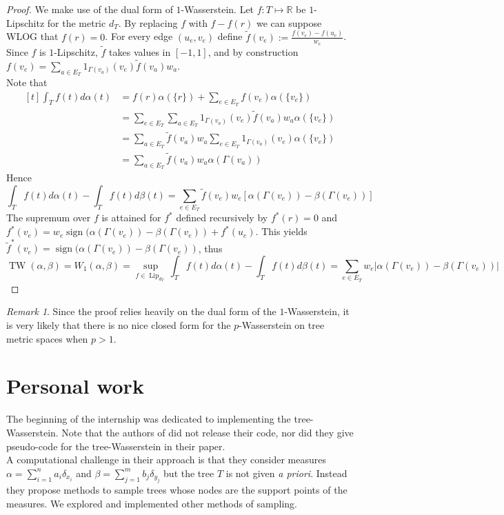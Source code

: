 \documentclass[12pt]{report}
\theoremstyle{definition}
\theoremstyle{remark}
\newtheorem{rem}[defi]{Remark}
\DeclareMathOperator{\lip}{Lip}
\DeclareMathOperator{\tw}{TW}
\DeclareMathOperator{\sgn}{sign}
\begin{document}
\begin{proof}
	We make use of the dual form of $1$-Wasserstein. Let $f:T\mapsto \mathbb R$ be $1$-Lipschitz for the metric $d_T$. By replacing $f$ with $f-f(r)$ we can suppose WLOG that $f(r)=0$. For every edge $(u_e,v_e)$ define $\tilde f(v_e):=\frac{f(v_e)-f(u_e)}{w_e}$. Since $f$ is $1$-Lipschitz, $\tilde f$ takes values in $[-1,1]$, and by construction $\displaystyle f(v_e)=\sum_{a\in E_T} 1_{\Gamma(v_a)}(v_e)\tilde f(v_a)w_a$.\\
	Note that $$\begin{aligned}[t]
		\int_T f(t) d\alpha(t) &= f(r)\alpha(\{r\}) + \sum_{e\in E_T} f(v_e)\alpha(\{v_e\}) \\
		&= \sum_{e\in E_T} \sum_{a\in E_T} 1_{\Gamma(v_a)}(v_e)\tilde f(v_a)w_a\alpha(\{v_e\})\\
		&= \sum_{a\in E_T} \tilde f(v_a)w_a \sum_{e\in E_T}  1_{\Gamma(v_a)}(v_e)\alpha(\{v_e\}) \\
		&= \sum_{a\in E_T} \tilde f(v_a)w_a \alpha(\Gamma(v_a))
	\end{aligned}$$
	Hence $$\int_T f(t) d\alpha(t) -\int_T f(t) d\beta(t) = \sum_{e\in E_T} \tilde f(v_e)w_e \left[\alpha(\Gamma(v_e))-\beta(\Gamma(v_e))\right]$$
	The supremum over $f$ is attained for $f^*$ defined recursively by $f^*(r)=0$ and $f^*(v_e)=w_e \sgn(\alpha(\Gamma(v_e))-\beta(\Gamma(v_e)) + f^*(u_e)$. This yields $\tilde f^*(v_e)=\sgn(\alpha(\Gamma(v_e))-\beta(\Gamma(v_e))$, thus 
	$$\tw(\alpha,\beta) = W_1(\alpha,\beta) = \sup_{f\in \lip_{d_T}} \int_T f(t) d\alpha(t) -\int_T f(t) d\beta(t) = \sum_{e\in E_T} w_e |\alpha(\Gamma(v_e))-\beta(\Gamma(v_e))|$$
\end{proof}

\begin{rem}
	Since the proof relies heavily on the dual form of the $1$-Wasserstein, it is very likely that there is no nice closed form for the $p$-Wasserstein on tree metric spaces when $p>1$.
\end{rem}

\section{Personal work}

\hspace{\parindent}
The beginning of the internship was dedicated to implementing the tree-Wasserstein. Note that the authors of \cite{le2019tree} did not release their code, nor did they give pseudo-code for the tree-Wasserstein in their paper.\\
A computational challenge in their approach is that they consider measures $\alpha=\sum_{i=1}^n a_i \delta_{x_i}$ and $\beta=\sum_{j=1}^m b_j \delta_{y_j}$ but the tree $T$ is not given \textit{a priori}. Instead they propose methods to sample trees whose nodes are the support points of the measures. We explored and implemented other methods of sampling.
\end{document}
